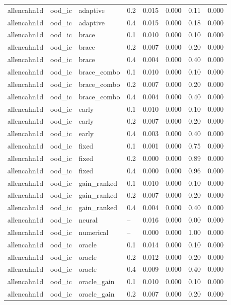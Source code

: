 \begin{longtable}{llllrrrr}
allencahn1d & ood\_ic & adaptive & 0.2 & 0.015 & 0.000 & 0.11 & 0.000 \\
allencahn1d & ood\_ic & adaptive & 0.4 & 0.015 & 0.000 & 0.18 & 0.000 \\
allencahn1d & ood\_ic & brace & 0.1 & 0.010 & 0.000 & 0.10 & 0.000 \\
allencahn1d & ood\_ic & brace & 0.2 & 0.007 & 0.000 & 0.20 & 0.000 \\
allencahn1d & ood\_ic & brace & 0.4 & 0.004 & 0.000 & 0.40 & 0.000 \\
allencahn1d & ood\_ic & brace\_combo & 0.1 & 0.010 & 0.000 & 0.10 & 0.000 \\
allencahn1d & ood\_ic & brace\_combo & 0.2 & 0.007 & 0.000 & 0.20 & 0.000 \\
allencahn1d & ood\_ic & brace\_combo & 0.4 & 0.004 & 0.000 & 0.40 & 0.000 \\
allencahn1d & ood\_ic & early & 0.1 & 0.010 & 0.000 & 0.10 & 0.000 \\
allencahn1d & ood\_ic & early & 0.2 & 0.007 & 0.000 & 0.20 & 0.000 \\
allencahn1d & ood\_ic & early & 0.4 & 0.003 & 0.000 & 0.40 & 0.000 \\
allencahn1d & ood\_ic & fixed & 0.1 & 0.001 & 0.000 & 0.75 & 0.000 \\
allencahn1d & ood\_ic & fixed & 0.2 & 0.000 & 0.000 & 0.89 & 0.000 \\
allencahn1d & ood\_ic & fixed & 0.4 & 0.000 & 0.000 & 0.96 & 0.000 \\
allencahn1d & ood\_ic & gain\_ranked & 0.1 & 0.010 & 0.000 & 0.10 & 0.000 \\
allencahn1d & ood\_ic & gain\_ranked & 0.2 & 0.007 & 0.000 & 0.20 & 0.000 \\
allencahn1d & ood\_ic & gain\_ranked & 0.4 & 0.004 & 0.000 & 0.40 & 0.000 \\
allencahn1d & ood\_ic & neural & -- & 0.016 & 0.000 & 0.00 & 0.000 \\
allencahn1d & ood\_ic & numerical & -- & 0.000 & 0.000 & 1.00 & 0.000 \\
allencahn1d & ood\_ic & oracle & 0.1 & 0.014 & 0.000 & 0.10 & 0.000 \\
allencahn1d & ood\_ic & oracle & 0.2 & 0.012 & 0.000 & 0.20 & 0.000 \\
allencahn1d & ood\_ic & oracle & 0.4 & 0.009 & 0.000 & 0.40 & 0.000 \\
allencahn1d & ood\_ic & oracle\_gain & 0.1 & 0.010 & 0.000 & 0.10 & 0.000 \\
allencahn1d & ood\_ic & oracle\_gain & 0.2 & 0.007 & 0.000 & 0.20 & 0.000 \\

\end{longtable}
